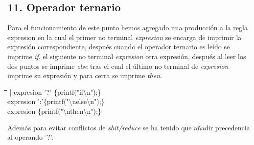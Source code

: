 \documentclass[11pt,spanish]{article}
\begin{document}
		\subsection*{11. Operador ternario}
		\label{subsec:11}
		Para el funcionamiento de este punto hemos agregado una producción a la regla {\ttfamily expresion} en la cual el primer no terminal \textit {expresion} se encarga de imprimir la expresión correspondiente, después cuando el operador ternario es leído se imprime \textit {if}, el siguiente no terminal \textit {expresion} otra expresión, después al leer los dos puntos se imprime \textit {else} tras el cual el último no terminal de \textit {expresion} imprime su expresión y para cerra se imprime \textit {then}.
		\begin{tabbing}
			\hspace*{1cm}\=\hspace*{1cm}\= \hspace*{4cm}\=\kill
			\>| expresion '?' \>\> \{printf("if\textbackslash n");\}\\
			\>\>expresion ':'\>\{printf("\textbackslash nelse\textbackslash n");\}\\
			\>\>expresion \>\{printf("\textbackslash nthen\textbackslash n");\}
			
		\end{tabbing}
		Además para evitar conflictos de \textit {shit/reduce} se ha tenido que añadir precedencia al operando '?'.
\end{document}
